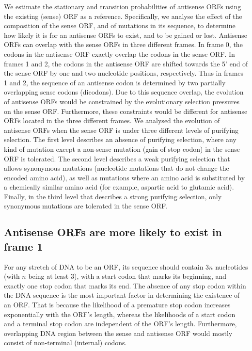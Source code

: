 \documentclass[12pt,a4paper]{article}
\begin{document}
We estimate the stationary and transition probabilities of antisense ORFs using the existing (sense) ORF as a reference. Specifically, we analyse the effect of the composition of the sense ORF, and of mutations in its sequence, to determine how likely it is for an antisense ORFs to exist, and to be gained or lost. Antisense ORFs can overlap with the sense ORFs in three different frames. In frame 0, the codons in the antisense ORF exactly overlap the codons in the sense ORF. In frames 1 and 2, the codons in the antisense ORF are shifted towards the 5' end of the sense ORF by one and two nucleotide positions, respectively. Thus in frames 1 and 2, the sequence of an antisense codon is determined by two partially overlapping sense codons (dicodons). Due to this sequence overlap, the evolution of antisense ORFs would be constrained by the evolutionary selection pressures on the sense ORF. Furthermore, these constraints would be different for antisense ORFs located in the three different frames. We analysed the evolution of antisense ORFs when the sense ORF is under three different levels of purifying selection. The first level describes an absence of purifying selection, where any kind of mutation except a non-sense mutation (gain of stop codon) in the sense ORF is tolerated. The second level describes a weak purifying selection that allows synonymous mutations (nucleotide mutations that do not change the encoded amino acid), as well as mutations where an amino acid is substituted by a chemically similar amino acid (for example, aspartic acid to glutamic acid). Finally, in the third level that describes a strong purifying selection, only synonymous mutations are tolerated in the sense ORF.

\subsection*{Antisense ORFs are more likely to exist in frame 1}

For any stretch of DNA to be an ORF, its sequence should contain 3$n$ nucleotides (with $n$ being at least 3), with a start codon that marks its beginning, and exactly one stop codon that marks its end. The absence of any stop codon within the DNA sequence is the most important factor in determining the existence of an ORF. That is because the likelihood of a premature stop codon increases exponentially with the ORF's length, whereas the likelihoods of a start codon and a terminal stop codon are independent of the ORF's length. Furthermore, overlapping DNA region between the sense and antisense ORF would mostly consist of non-terminal (internal) codons. 
\end{document}
